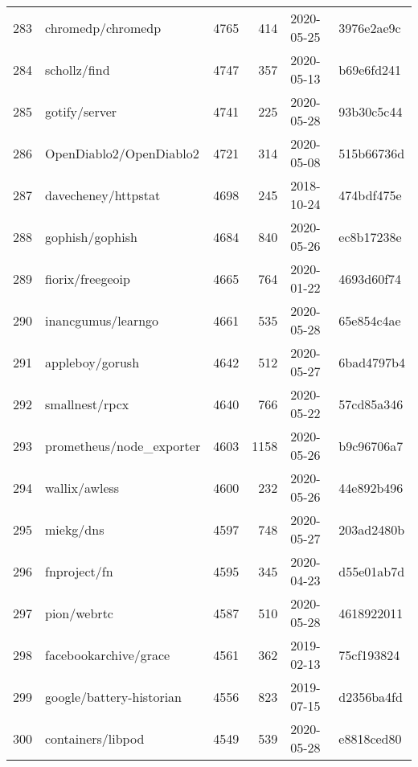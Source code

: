 \begin{longtable}{llrrll}
    283 &                                  chromedp/chromedp &   4765 &    414 & 2020-05-25 &  3976e2ae9c \\
    284 &                                       schollz/find &   4747 &    357 & 2020-05-13 &  b69e6fd241 \\
    285 &                                      gotify/server &   4741 &    225 & 2020-05-28 &  93b30c5c44 \\
    286 &                            OpenDiablo2/OpenDiablo2 &   4721 &    314 & 2020-05-08 &  515b66736d \\
    287 &                                davecheney/httpstat &   4698 &    245 & 2018-10-24 &  474bdf475e \\
    288 &                                    gophish/gophish &   4684 &    840 & 2020-05-26 &  ec8b17238e \\
    289 &                                   fiorix/freegeoip &   4665 &    764 & 2020-01-22 &  4693d60f74 \\
    290 &                                 inancgumus/learngo &   4661 &    535 & 2020-05-28 &  65e854c4ae \\
    291 &                                    appleboy/gorush &   4642 &    512 & 2020-05-27 &  6bad4797b4 \\
    292 &                                     smallnest/rpcx &   4640 &    766 & 2020-05-22 &  57cd85a346 \\
    293 &                           prometheus/node\_exporter &   4603 &   1158 & 2020-05-26 &  b9c96706a7 \\
    294 &                                      wallix/awless &   4600 &    232 & 2020-05-26 &  44e892b496 \\
    295 &                                          miekg/dns &   4597 &    748 & 2020-05-27 &  203ad2480b \\
    296 &                                       fnproject/fn &   4595 &    345 & 2020-04-23 &  d55e01ab7d \\
    297 &                                        pion/webrtc &   4587 &    510 & 2020-05-28 &  4618922011 \\
    298 &                              facebookarchive/grace &   4561 &    362 & 2019-02-13 &  75cf193824 \\
    299 &                           google/battery-historian &   4556 &    823 & 2019-07-15 &  d2356ba4fd \\
    300 &                                  containers/libpod &   4549 &    539 & 2020-05-28 &  e8818ced80 \\

\end{longtable}
